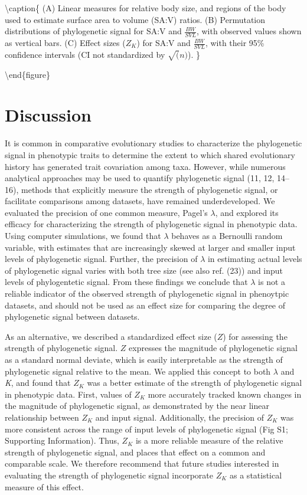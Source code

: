\documentclass[9pt,twocolumn,twoside,lineno]{pnas-new}
\begin{document}
\textbackslash caption\{ (A) Linear measures for relative body size, and
regions of the body used to estimate surface area to volume (SA:V)
ratios. (B) Permutation distributions of phylogenetic signal for SA:V
and \(\frac{BW}{SVL}\), with observed values shown as vertical bars. (C)
Effect sizes (\(Z_K\)) for SA:V and \(\frac{BW}{SVL}\), with their 95\%
confidence intervals (CI not standardized by \(\sqrt(n)\)). \}

\textbackslash end\{figure\}

\hypertarget{discussion}{%
\section{Discussion}\label{discussion}}

It is common in comparative evolutionary studies to characterize the
phylogenetic signal in phenotypic traits to determine the extent to
which shared evolutionary history has generated trait covariation among
taxa. However, while numerous analytical approaches may be used to
quantify phylogenetic signal (11, 12, 14--16), methods that explicitly
measure the strength of phylogenetic signal, or facilitate comparisons
among datasets, have remained underdeveloped. We evaluated the precision
of one common measure, Pagel's \(\lambda\), and explored its efficacy
for characterizing the strength of phylogenetic signal in phenotypic
data. Using computer simulations, we found that \(\lambda\) behaves as a
Bernoulli random variable, with estimates that are increasingly skewed
at larger and smaller input levels of phylogenetic signal. Further, the
precision of \(\lambda\) in estimating actual levels of phylogenetic
signal varies with both tree size (see also ref. (23)) and input levels
of phylogentetic signal. From these findings we conclude that
\(\lambda\) is not a reliable indicator of the observed strength of
phylogenetic signal in phenoytpic datasets, and should not be used as an
effect size for comparing the degree of phylogenetic signal between
datasets.

As an alternative, we described a standardized effect size (\(Z\)) for
assessing the strength of phylogenetic signal. \(Z\) expresses the
magnitude of phylogenetic signal as a standard normal deviate, which is
easily interpretable as the strength of phylogenetic signal relative to
the mean. We applied this concept to both \(\lambda\) and \emph{K}, and
found that \(Z_K\) was a better estimate of the strength of phylogenetic
signal in phenotypic data. First, values of \(Z_K\) more accurately
tracked known changes in the magnitude of phylogenetic signal, as
demonstrated by the near linear relationship between \(Z_K\) and input
signal. Additionally, the precision of \(Z_K\) was more consistent
across the range of input levels of phylogenetic signal (Fig S1;
Supporting Information). Thus, \(Z_K\) is a more reliable measure of the
relative strength of phylogenetic signal, and places that effect on a
common and comparable scale. We therefore recommend that future studies
interested in evaluating the strength of phylogenetic signal incorporate
\(Z_K\) as a statistical measure of this effect.
\end{document}
